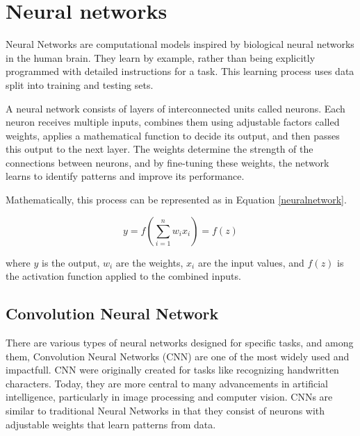 
\section{Neural networks}

Neural Networks are computational models inspired by biological neural networks in the human brain. They learn by example, rather than being explicitly programmed with detailed instructions for a task. This learning process uses data split into training and testing sets. 

A neural network consists of layers of interconnected units called neurons. Each neuron receives multiple inputs, combines them using adjustable factors called weights, applies a mathematical function to decide its output, and then passes this output to the next layer. The weights determine the strength of the connections between neurons, and by fine-tuning these weights, the network learns to identify patterns and improve its performance.

Mathematically, this process can be represented as in Equation \ref{neuralnetwork}.

\begin{equation}
   y = f\left(\sum_{i=1}^{n} w_i x_i\right) = f(z)
   \label{neuralnetwork}
\end{equation}

where \( y \) is the output, \( w_i \) are the weights, \( x_i \) are the input values, and \( f(z) \) is the activation function applied to the combined inputs.

\subsection{Convolution Neural Network}


There are various types of neural networks designed for specific tasks, and among them, Convolution Neural Networks (CNN) are one of the most widely used and impactfull. CNN were originally created for tasks like recognizing handwritten characters. Today, they are more central to many advancements in artificial intelligence, particularly in image processing and computer vision. CNNs are similar to traditional Neural Networks in that they consist of neurons with adjustable weights that learn patterns from data.




